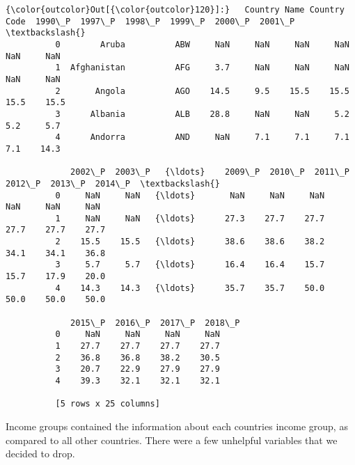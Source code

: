 \documentclass[11pt]{article}
\begin{document}
\begin{Verbatim}[commandchars=\\\{\}]
{\color{outcolor}Out[{\color{outcolor}120}]:}   Country Name Country Code  1990\_P  1997\_P  1998\_P  1999\_P  2000\_P  2001\_P  \textbackslash{}
          0        Aruba          ABW     NaN     NaN     NaN     NaN     NaN     NaN   
          1  Afghanistan          AFG     3.7     NaN     NaN     NaN     NaN     NaN   
          2       Angola          AGO    14.5     9.5    15.5    15.5    15.5    15.5   
          3      Albania          ALB    28.8     NaN     NaN     5.2     5.2     5.7   
          4      Andorra          AND     NaN     7.1     7.1     7.1     7.1    14.3   
          
             2002\_P  2003\_P   {\ldots}    2009\_P  2010\_P  2011\_P  2012\_P  2013\_P  2014\_P  \textbackslash{}
          0     NaN     NaN   {\ldots}       NaN     NaN     NaN     NaN     NaN     NaN   
          1     NaN     NaN   {\ldots}      27.3    27.7    27.7    27.7    27.7    27.7   
          2    15.5    15.5   {\ldots}      38.6    38.6    38.2    34.1    34.1    36.8   
          3     5.7     5.7   {\ldots}      16.4    16.4    15.7    15.7    17.9    20.0   
          4    14.3    14.3   {\ldots}      35.7    35.7    50.0    50.0    50.0    50.0   
          
             2015\_P  2016\_P  2017\_P  2018\_P  
          0     NaN     NaN     NaN     NaN  
          1    27.7    27.7    27.7    27.7  
          2    36.8    36.8    38.2    30.5  
          3    20.7    22.9    27.9    27.9  
          4    39.3    32.1    32.1    32.1  
          
          [5 rows x 25 columns]
\end{Verbatim}
            
    Income groups contained the information about each countries income
group, as compared to all other countries. There were a few unhelpful
variables that we decided to drop.
\end{document}
